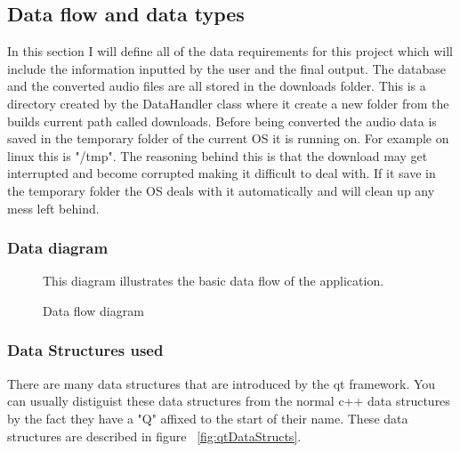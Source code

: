 \documentclass{article}
\begin{document}
\subsection{Data flow and data types}
In this section I will define all of the data requirements for this project which will include
the information inputted by the user and the final output. The database and the converted audio
files are all stored in the downloads folder. This is a directory created by the DataHandler
class where it create a new folder from the builds current path called downloads. Before being
converted the audio data is saved in the temporary folder of the current OS it is running on.
For example on linux this is "/tmp". The reasoning behind this is that the download may get
interrupted and become corrupted making it difficult to deal with. If it save in the temporary
folder the OS deals with it automatically and will clean up any mess left behind.

\subsubsection{Data diagram}
\begin{figure}[H]
    \caption{Data flow diagram} \label{fig:Data flow diagram}
    This diagram illustrates the basic data flow of the application.
\end{figure}


\subsubsection{Data Structures used}
There are many data structures that are introduced by the qt framework. You can usually distiguist
these data structures from the normal c++ data structures by the fact they have a "Q" affixed to
the start of their name. These data structures are described in figure ~\ref{fig:qtDataStructs}.
\end{document}
